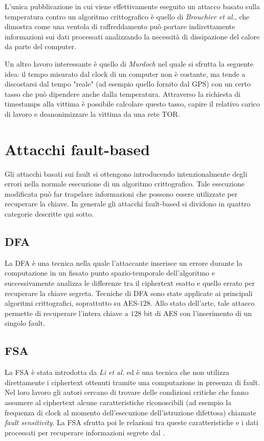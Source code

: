 		L'unica pubblicazione in cui viene effettivamente eseguito un attacco basato sulla temperatura contro un algoritmo crittografico è quello di \emph{Brouchier et al.}\cite{brouchier2009temperature}, che dimostra come una ventola di raffreddamento può portare indirettamente informazioni sui dati processati analizzando la necessità di dissipazione del calore da parte del computer.
		
		Un altro lavoro interessante è quello di \emph{Murdoch}\cite{murdoch2006hot} nel quale si sfrutta la seguente idea: il tempo misurato dal clock di un computer non è costante, ma tende a discostarsi dal tempo "reale" (ad esempio quello fornito dal \acs{GPS}) con un certo tasso che può dipendere anche dalla temperatura\cite{vig1992introduction}. Attraverso la richiesta di timestamps alla vittima è possibile calcolare questo tasso, capire il relativo carico di lavoro e deanonimizzare la vittima da una rete \acs{TOR}.
		
	\section{Attacchi fault-based}
		Gli attacchi basati sui fault si ottengono introducendo intenzionalmente degli errori nella normale esecuzione di un algoritmo crittografico. Tale esecuzione modificata può far trapelare informazioni che possono essere utilizzate per recuperare la chiave. In generale gli attacchi fault-based si dividono in quattro categorie\cite{patranabis2018fault} descritte qui sotto.
		
		\subsection*{\ac{DFA}}
			La \ac{DFA} è una tecnica nella quale l'attaccante inserisce un errore durante la computazione in un fissato punto spazio-temporale dell'algoritmo e successivamente analizza le differenze tra il ciphertext esatto e quello errato per recuperare la chiave segreta. Tecniche di \ac{DFA} sono state applicate ai principali algoritmi crittografici, soprattutto su \ac{AES}-$128$. Allo stato dell'arte, tale attacco permette di recuperare l'intera chiave a $128$ bit di \ac{AES} con l'inserimento di un singolo fault\cite{tunstall2011differential}.
			
		\subsection*{\ac{FSA}}
			La \ac{FSA} è stata introdotta da \emph{Li et al.}\cite{li2010fault} ed è una tecnica che non utilizza direttamente i ciphertext ottenuti tramite una computazione in presenza di fault. Nel loro lavoro gli autori cercano di trovare delle condizioni critiche che fanno assumere al ciphertext alcune caratteristiche riconoscibili (ad esempio la frequenza di clock al momento dell'esecuzione dell'istruzione difettosa) chiamate \emph{fault sensitivity}. La \ac{FSA} sfrutta poi le relazioni tra queste caratteristiche e i dati processati per recuperare informazioni segrete dal \disps.
			
